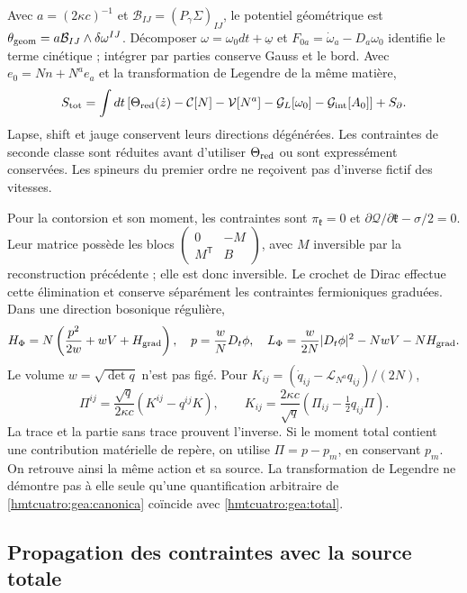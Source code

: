 Avec $a=(2\kappa c)^{-1}$ et $\mathcal B_{IJ}=(P_\gamma\Sigma)_{IJ}$, le potentiel géométrique est $\theta_{\rm geom}=a\mathcal B_{IJ}\wedge\delta\omega^{IJ}$. Décomposer $\omega=\omega_0dt+\underline\omega$ et $F_{0a}=\dot\omega_a-D_a\omega_0$ identifie le terme cinétique ; intégrer par parties conserve Gauss et le bord. Avec $e_0=Nn+N^ae_a$ et la transformation de Legendre de la même matière,
\begin{equation}
S_{\rm tot}=\int dt\,[\Theta_{\rm red}(\dot z)
-\mathcal C[N]-\mathcal V[N^a]-\mathcal G_L[\omega_0]
-\mathcal G_{\rm int}[A_0]]+S_\partial.
\label{hmtcuatro:gea:canonica}
\end{equation}
Lapse, shift et jauge conservent leurs directions dégénérées. Les contraintes de seconde classe sont réduites avant d’utiliser $\Theta_{\rm red}$ ou sont expressément conservées. Les spineurs du premier ordre ne reçoivent pas d’inverse fictif des vitesses.

Pour la contorsion et son moment, les contraintes sont $\pi_{\mathfrak k}=0$ et $\partial\mathcal Q/\partial\mathfrak k-\sigma/2=0$. Leur matrice possède les blocs $\left(\begin{smallmatrix}0&-M\\M^{\mathsf T}&B\end{smallmatrix}\right)$, avec $M$ inversible par la reconstruction précédente ; elle est donc inversible. Le crochet de Dirac effectue cette élimination et conserve séparément les contraintes fermioniques graduées. Dans une direction bosonique régulière,
\[
H_\Phi=N\left(\frac{p^2}{2w}+wV+H_{\rm grad}\right),\quad
p=\frac wN D_t\phi,\quad
L_\Phi=\frac{w}{2N}|D_t\phi|^2-NwV-NH_{\rm grad}.
\]
Le volume $w=\sqrt{\det q}$ n’est pas figé. Pour $K_{ij}=(\dot q_{ij}-\mathcal L_{N^a}q_{ij})/(2N)$,
\[
\Pi^{ij}=\frac{\sqrt q}{2\kappa c}(K^{ij}-q^{ij}K),\qquad
K_{ij}=\frac{2\kappa c}{\sqrt q}
(\Pi_{ij}-\tfrac12q_{ij}\Pi).
\]
La trace et la partie sans trace prouvent l’inverse. Si le moment total contient une contribution matérielle de repère, on utilise $\Pi=p-p_m$, en conservant $p_m$. On retrouve ainsi la même action et sa source. La transformation de Legendre ne démontre pas à elle seule qu’une quantification arbitraire de \eqref{hmtcuatro:gea:canonica} coïncide avec \eqref{hmtcuatro:gea:total}.

\subsection{Propagation des contraintes avec la source totale}
\label{hmtcuatro:gea:restricciones}

